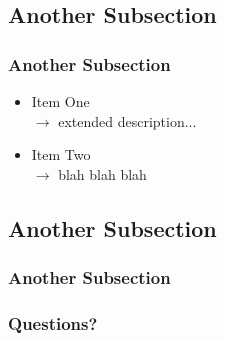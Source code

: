 \documentclass{beamer}
\begin{document}

\subsection{Another Subsection}
\begin{frame}
\frametitle{\textbf{Another Subsection}}
\begin{itemize}
\justifying
\item<1-> \alert<+>{Item One \\ $\rightarrow$ extended description...}
\item<2-> \alert<+>{Item Two \\  $\rightarrow$ blah blah blah}
\end{itemize}
\end{frame}


\subsection{Another Subsection}
\begin{frame}
\frametitle{\textbf{Another Subsection}}
\end{frame}


\begin{frame}
\frametitle{\textbf{Questions?}}
\large{\centerline{\textbf{}}}
\end{frame}

\end{document}

